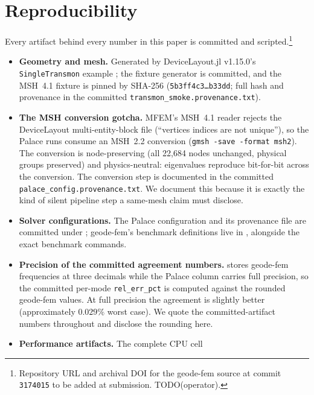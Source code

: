 \documentclass{anvil-paper}
\begin{document}
\section{Reproducibility}
\label{sec:repro}

Every artifact behind every number in this paper is committed and
scripted.\footnote{Repository URL and archival DOI for the geode-fem
source at commit \texttt{3174015} to be added at submission.
TODO(operator).}

\begin{itemize}
  \item \textbf{Geometry and mesh.} Generated by DeviceLayout.jl v1.15.0's
    \texttt{SingleTransmon} example \citep{devicelayout}; the fixture
    generator is committed, and the MSH~4.1 fixture is pinned by SHA-256
    (\texttt{5b3ff4c3\ldots{}b33dd}; full hash and provenance in the
    committed \texttt{transmon\_smoke.provenance.txt}).
  \item \textbf{The MSH conversion gotcha.} MFEM's MSH~4.1 reader rejects
    the DeviceLayout multi-entity-block file (``vertices indices are not
    unique''), so the Palace runs consume an MSH~2.2 conversion
    (\texttt{gmsh -save -format msh2}). The conversion is node-preserving
    (all 22{,}684 nodes unchanged, physical groups preserved) and
    physics-neutral: eigenvalues reproduce bit-for-bit across the
    conversion. The conversion step is documented in the committed
    \texttt{palace\_config.provenance.txt}. We document this because it is
    exactly the kind of silent pipeline step a same-mesh claim must
    disclose.
  \item \textbf{Solver configurations.} The Palace configuration and its
    provenance file are committed under
    ; geode-fem's benchmark
    definitions live in ,
    alongside the exact benchmark commands.
  \item \textbf{Precision of the committed agreement numbers.}
     stores geode-fem
    frequencies at three decimals while the Palace column carries full
    precision, so the committed per-mode \texttt{rel\_err\_pct} is
    computed against the rounded geode-fem values. At full precision the
    agreement is slightly better (approximately $0.029\%$ worst case). We
    quote the committed-artifact numbers throughout and disclose the
    rounding here.
  \item \textbf{Performance artifacts.} The complete CPU cell

\end{itemize}
\end{document}
